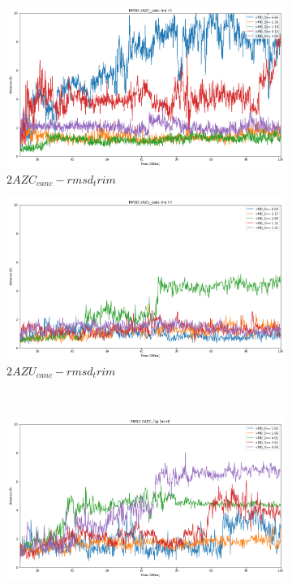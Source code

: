 \documentclass[fleqn,10pt]{wlscirep}
\begin{document}
\begin{figure}[!ht]
\centering
   \begin{subfigure}{.45\textwidth}
     \centering
     \includegraphics[width=.95\linewidth]{2AZC_canc/2AZC_canc-rmsd-trim.png}
     \caption{$2AZC_{canc}-rmsd_trim$}
     \label{fig:2AZC_canc-rmsd_trim}
   \end{subfigure}
   \begin{subfigure}{.45\textwidth}
     \centering
     \includegraphics[width=.95\linewidth]{2AZU_canc/2AZU_canc-rmsd-trim.png}
     \caption{$2AZU_{canc}-rmsd_trim$}
     \label{fig:2AZU_canc-rmsd_trim}
   \end{subfigure}
   \\
   \begin{subfigure}{.45\textwidth}
     \centering
     \includegraphics[width=.95\linewidth]{2AZC_flip/2AZC_flip-rmsd-trim.png}

\end{subfigure}
\end{figure}
\end{document}
